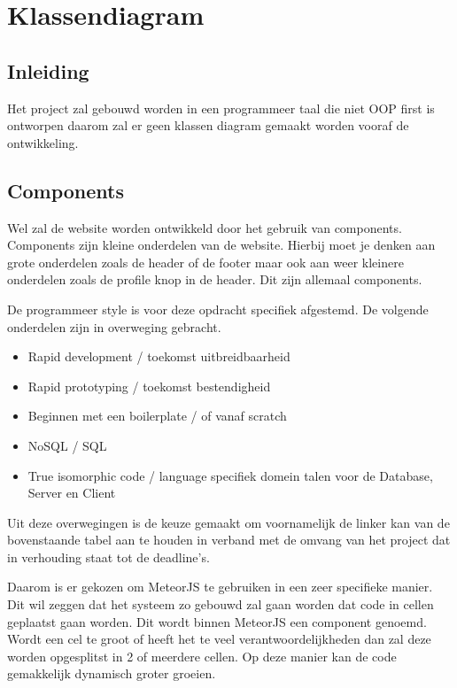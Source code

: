 \documentclass[]{report}
\begin{document}
\chapter{Klassendiagram}

\section{Inleiding}
Het project zal gebouwd worden in een programmeer taal die niet OOP first is ontworpen daarom zal er geen klassen diagram gemaakt worden vooraf de ontwikkeling.

\section{Components}
Wel zal de website worden ontwikkeld door het gebruik van components. Components zijn kleine onderdelen van de website. Hierbij moet je denken aan grote onderdelen zoals de header of de footer maar ook aan weer kleinere onderdelen zoals de profile knop in de header. Dit zijn allemaal components.

\vspace{1 cm}

De programmeer style is voor deze opdracht specifiek afgestemd. De volgende onderdelen zijn in overweging gebracht.

\begin{itemize}
	\item Rapid development / toekomst uitbreidbaarheid
	\item Rapid prototyping / toekomst bestendigheid
	\item Beginnen met een boilerplate / of vanaf scratch
	\item NoSQL / SQL
	\item True isomorphic code / language specifiek domein talen voor de Database, Server en Client
\end{itemize}

Uit deze overwegingen is de keuze gemaakt om voornamelijk de linker kan van de bovenstaande tabel aan te houden in verband met de omvang van het project dat in verhouding staat tot de deadline's. 

Daarom is er gekozen om MeteorJS te gebruiken in een zeer specifieke manier. Dit wil zeggen dat het systeem zo gebouwd zal gaan worden dat code in cellen geplaatst gaan worden. Dit wordt binnen MeteorJS een component genoemd. Wordt een cel te groot of heeft het te veel verantwoordelijkheden dan zal deze worden opgesplitst in 2 of meerdere cellen. Op deze manier kan de code gemakkelijk dynamisch groter groeien.
\end{document}
